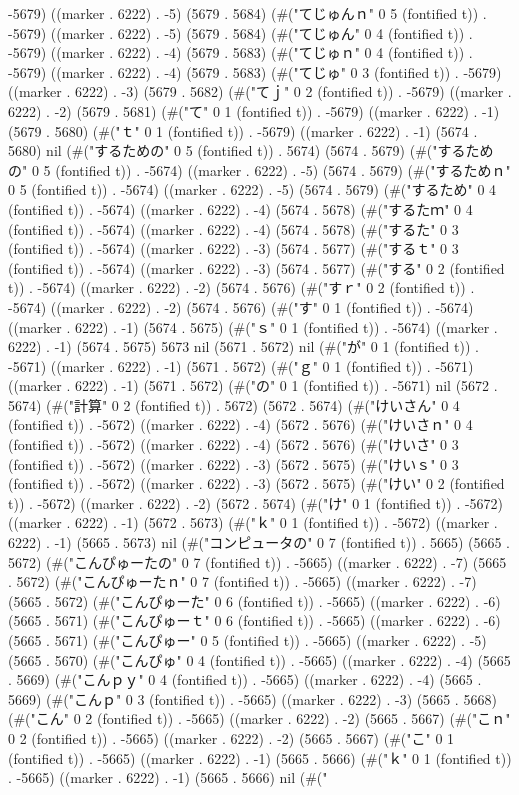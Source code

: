 {-5679) ((marker . 6222) . -5) (5679 . 5684) (#("てじゅんｎ" 0 5 (fontified t)) . -5679) ((marker . 6222) . -5) (5679 . 5684) (#("てじゅん" 0 4 (fontified t)) . -5679) ((marker . 6222) . -4) (5679 . 5683) (#("てじゅｎ" 0 4 (fontified t)) . -5679) ((marker . 6222) . -4) (5679 . 5683) (#("てじゅ" 0 3 (fontified t)) . -5679) ((marker . 6222) . -3) (5679 . 5682) (#("てｊ" 0 2 (fontified t)) . -5679) ((marker . 6222) . -2) (5679 . 5681) (#("て" 0 1 (fontified t)) . -5679) ((marker . 6222) . -1) (5679 . 5680) (#("ｔ" 0 1 (fontified t)) . -5679) ((marker . 6222) . -1) (5674 . 5680) nil (#("するための" 0 5 (fontified t)) . 5674) (5674 . 5679) (#("するための" 0 5 (fontified t)) . -5674) ((marker . 6222) . -5) (5674 . 5679) (#("するためｎ" 0 5 (fontified t)) . -5674) ((marker . 6222) . -5) (5674 . 5679) (#("するため" 0 4 (fontified t)) . -5674) ((marker . 6222) . -4) (5674 . 5678) (#("するたｍ" 0 4 (fontified t)) . -5674) ((marker . 6222) . -4) (5674 . 5678) (#("するた" 0 3 (fontified t)) . -5674) ((marker . 6222) . -3) (5674 . 5677) (#("するｔ" 0 3 (fontified t)) . -5674) ((marker . 6222) . -3) (5674 . 5677) (#("する" 0 2 (fontified t)) . -5674) ((marker . 6222) . -2) (5674 . 5676) (#("すｒ" 0 2 (fontified t)) . -5674) ((marker . 6222) . -2) (5674 . 5676) (#("す" 0 1 (fontified t)) . -5674) ((marker . 6222) . -1) (5674 . 5675) (#("ｓ" 0 1 (fontified t)) . -5674) ((marker . 6222) . -1) (5674 . 5675) 5673 nil (5671 . 5672) nil (#("が" 0 1 (fontified t)) . -5671) ((marker . 6222) . -1) (5671 . 5672) (#("ｇ" 0 1 (fontified t)) . -5671) ((marker . 6222) . -1) (5671 . 5672) (#("の" 0 1 (fontified t)) . -5671) nil (5672 . 5674) (#("計算" 0 2 (fontified t)) . 5672) (5672 . 5674) (#("けいさん" 0 4 (fontified t)) . -5672) ((marker . 6222) . -4) (5672 . 5676) (#("けいさｎ" 0 4 (fontified t)) . -5672) ((marker . 6222) . -4) (5672 . 5676) (#("けいさ" 0 3 (fontified t)) . -5672) ((marker . 6222) . -3) (5672 . 5675) (#("けいｓ" 0 3 (fontified t)) . -5672) ((marker . 6222) . -3) (5672 . 5675) (#("けい" 0 2 (fontified t)) . -5672) ((marker . 6222) . -2) (5672 . 5674) (#("け" 0 1 (fontified t)) . -5672) ((marker . 6222) . -1) (5672 . 5673) (#("ｋ" 0 1 (fontified t)) . -5672) ((marker . 6222) . -1) (5665 . 5673) nil (#("コンピュータの" 0 7 (fontified t)) . 5665) (5665 . 5672) (#("こんぴゅーたの" 0 7 (fontified t)) . -5665) ((marker . 6222) . -7) (5665 . 5672) (#("こんぴゅーたｎ" 0 7 (fontified t)) . -5665) ((marker . 6222) . -7) (5665 . 5672) (#("こんぴゅーた" 0 6 (fontified t)) . -5665) ((marker . 6222) . -6) (5665 . 5671) (#("こんぴゅーｔ" 0 6 (fontified t)) . -5665) ((marker . 6222) . -6) (5665 . 5671) (#("こんぴゅー" 0 5 (fontified t)) . -5665) ((marker . 6222) . -5) (5665 . 5670) (#("こんぴゅ" 0 4 (fontified t)) . -5665) ((marker . 6222) . -4) (5665 . 5669) (#("こんｐｙ" 0 4 (fontified t)) . -5665) ((marker . 6222) . -4) (5665 . 5669) (#("こんｐ" 0 3 (fontified t)) . -5665) ((marker . 6222) . -3) (5665 . 5668) (#("こん" 0 2 (fontified t)) . -5665) ((marker . 6222) . -2) (5665 . 5667) (#("こｎ" 0 2 (fontified t)) . -5665) ((marker . 6222) . -2) (5665 . 5667) (#("こ" 0 1 (fontified t)) . -5665) ((marker . 6222) . -1) (5665 . 5666) (#("ｋ" 0 1 (fontified t)) . -5665) ((marker . 6222) . -1) (5665 . 5666) nil (#("
}
